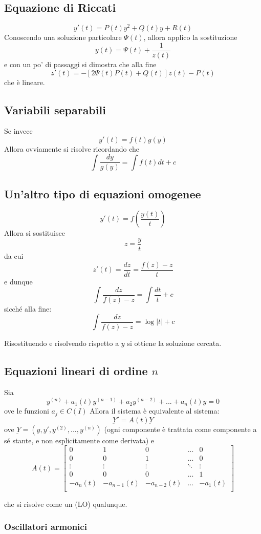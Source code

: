\documentclass[a4paper,12pt]{article}
\begin{document}
\subsection{Equazione di Riccati}
$$y'(t) = P(t)y^2+Q(t)y+R(t)$$
Conoscendo una soluzione particolare $\Psi(t)$, allora applico la sostituzione
$$y(t)=\Psi(t)+\dfrac{1}{z(t)}$$
e con un po' di passaggi si dimostra che alla fine
$$z'(t)= -\left[2\Psi(t)P(t)+Q(t)\right]z(t)-P(t)$$
che è lineare.
\subsection{Variabili separabili}
Se invece
$$y'(t) = f(t)g(y)$$
Allora ovviamente si risolve ricordando che
$$\int\dfrac{dy}{g(y)}=\int f(t)dt + c$$
\subsection{Un'altro tipo di equazioni omogenee}
$$y'(t) = f\left(\dfrac{y(t)}{t}\right)$$
Allora si sostituisce
$$z=\dfrac{y}{t}$$
da cui $$z'(t) = \dfrac{dz}{dt} = \dfrac{f(z)-z}{t}$$
e dunque
$$\int\dfrac{dz}{f(z)-z}=\int \dfrac{dt}{t} + c$$
sicché alla fine:
$$\int\dfrac{dz}{f(z)-z} = \log|t| + c$$

Risostituendo e risolvendo rispetto a $y$ si ottiene la soluzione cercata.

\subsection{Equazioni lineari di ordine $n$}
Sia
$$y^{(n)} + a_1(t)y^{(n-1)} + a_2y^{(n-2)} + ... + a_n(t)y = 0$$
ove le funzioni $a_j \in C(I)$
Allora il sistema è equivalente al sistema:
$$\underbar{Y}' = A(t)\underbar{Y}$$
ove $\underbar{Y}=(y, y', y^{(2)}, ..., y^{(n)})$ (ogni componente è trattata come componente a sé stante, e non esplicitamente come derivata) e
$$A(t) =
\begin{bmatrix}
0 & 1 & 0 & ... & 0\\
0 & 0 & 1 & ... & 0\\
\vdots & \vdots & \vdots & \ddots & \vdots \\
0 & 0 & 0 & ... & 1 \\
-a_n(t) & -a_{n-1}(t) & -a_{n-2}(t) & ... & -a_{1}(t) \\
\end{bmatrix}
$$

che si risolve come un (LO) qualunque.

\subsubsection{Oscillatori armonici}
\end{document}
